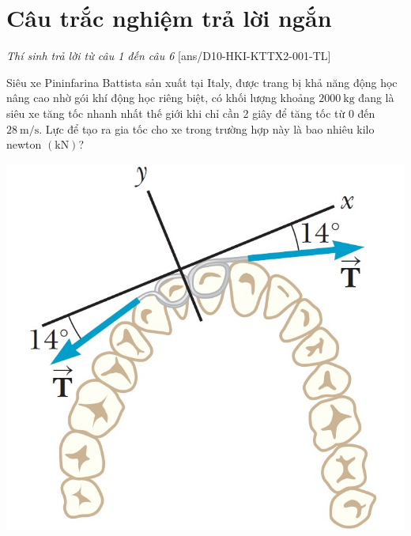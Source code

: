 \section{Câu trắc nghiệm trả lời ngắn} \textit{Thí sinh trả lời từ câu 1 đến câu 6}
\setcounter{ex}{0}
[ans/D10-HKI-KTTX2-001-TL]
\begin{ex}
	Siêu xe Pininfarina Battista sản xuất tại Italy, được trang bị khả năng động học nâng cao nhờ gói khí động học riêng biệt, có khối lượng khoảng $\SI{2000}{\kilogram}$ đang là siêu xe tăng tốc nhanh nhất thế giới khi chỉ cần 2 giây để tăng tốc từ 0 đến $\SI{28}{\meter/\second}$. Lực để tạo ra gia tốc cho xe trong trường hợp này là bao nhiêu kilo newton $\left(\si{\kilo\newton}\right)$?
	\loigiai{
		
	}
\end{ex}
\begin{ex}
	{\includegraphics[scale=0.25]{../figs/D10-HKI-KTTX2-002-1}}
	\loigiai{
		
	}
\end{ex}

